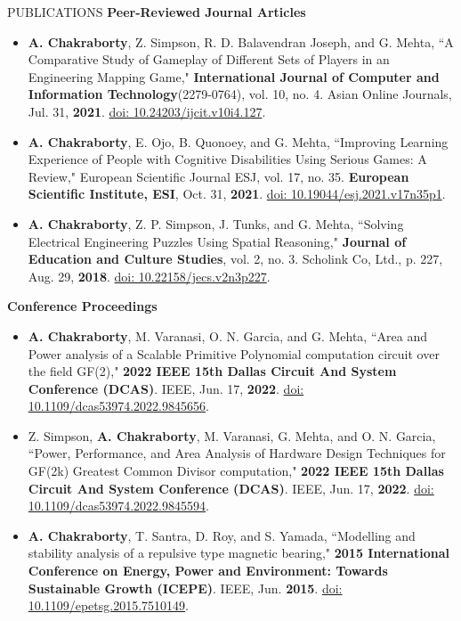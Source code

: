 \documentclass{resume} %
\begin{document}
\begin{rSection}{PUBLICATIONS}
    \textbf{Peer-Reviewed Journal Articles}
        \begin{itemize}
            \itemsep -3pt {} 
            \item \textbf{A. Chakraborty}, Z. Simpson, R. D. Balavendran Joseph, and G. Mehta, ``A Comparative Study of Gameplay of Different Sets of Players in an Engineering Mapping Game," \textbf{International Journal of Computer and Information Technology}(2279-0764), vol. 10, no. 4. Asian Online Journals, Jul. 31, \textbf{2021}. \href{https://doi.org/10.24203/ijcit.v10i4.127}{doi: 10.24203/ijcit.v10i4.127}.
            \item \textbf{A. Chakraborty}, E. Ojo, B. Quonoey, and G. Mehta, ``Improving Learning Experience of People with Cognitive Disabilities Using Serious Games: A Review," European Scientific Journal ESJ, vol. 17, no. 35. \textbf{European Scientific Institute, ESI}, Oct. 31, \textbf{2021}. \href{https://doi.org/10.19044/esj.2021.v17n35p1}{doi: 10.19044/esj.2021.v17n35p1}.
            \item \textbf{A. Chakraborty}, Z. P. Simpson, J. Tunks, and G. Mehta, ``Solving Electrical Engineering Puzzles Using Spatial Reasoning," \textbf{Journal of Education and Culture Studies}, vol. 2, no. 3. Scholink Co, Ltd., p. 227, Aug. 29, \textbf{2018}. \href{https://doi.org/10.22158/jecs.v2n3p227}{doi: 10.22158/jecs.v2n3p227}.
        \end{itemize}

    \textbf{Conference Proceedings}
        \begin{itemize}
            \itemsep -3pt {} 
            \item \textbf{A. Chakraborty}, M. Varanasi, O. N. Garcia, and G. Mehta, ``Area and Power analysis of a Scalable Primitive Polynomial computation circuit over the field GF(2)," \textbf{2022 IEEE 15th Dallas Circuit And System Conference (DCAS)}. IEEE, Jun. 17, \textbf{2022}. \href{https://doi.org/10.1109/DCAS53974.2022.9845656}{doi: 10.1109/dcas53974.2022.9845656}.
            \item Z. Simpson, \textbf{A. Chakraborty}, M. Varanasi, G. Mehta, and O. N. Garcia, ``Power, Performance, and Area Analysis of Hardware Design Techniques for GF(2k) Greatest Common Divisor computation," \textbf{2022 IEEE 15th Dallas Circuit And System Conference (DCAS)}. IEEE, Jun. 17, \textbf{2022}. \href{https://doi.org/10.1109/DCAS53974.2022.9845594}{doi: 10.1109/dcas53974.2022.9845594}.
            \item \textbf{A. Chakraborty}, T. Santra, D. Roy, and S. Yamada, ``Modelling and stability analysis of a repulsive type magnetic bearing," \textbf{2015 International Conference on Energy, Power and Environment: Towards Sustainable Growth (ICEPE)}. IEEE, Jun. \textbf{2015}. \href{https://doi.org/10.1109/EPETSG.2015.7510149}{doi: 10.1109/epetsg.2015.7510149}.
        \end{itemize}


\end{rSection}
\end{document}
